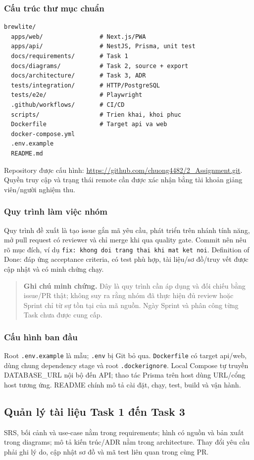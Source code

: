 \documentclass[12pt,a4paper]{article}
\newcommand{\tep}[1]{\nolinkurl{#1}}
\newcommand{\ghichu}[1]{\begin{quote}\small\textbf{Ghi chú minh chứng.} #1\end{quote}}
\begin{document}
\subsubsection{Cấu trúc thư mục chuẩn}
\begin{verbatim}
brewlite/
  apps/web/                # Next.js/PWA
  apps/api/                # NestJS, Prisma, unit test
  docs/requirements/       # Task 1
  docs/diagrams/           # Task 2, source + export
  docs/architecture/       # Task 3, ADR
  tests/integration/       # HTTP/PostgreSQL
  tests/e2e/               # Playwright
  .github/workflows/       # CI/CD
  scripts/                 # Trien khai, khoi phuc
  Dockerfile               # Target api va web
  docker-compose.yml
  .env.example
  README.md
\end{verbatim}
Repository được cấu hình: \url{https://github.com/chuong4482/2_Assignment.git}. Quyền truy cập và trạng thái remote cần được xác nhận bằng tài khoản giảng viên/người nghiệm thu.

\subsubsection{Quy trình làm việc nhóm}
Quy trình đề xuất là tạo issue gắn mã yêu cầu, phát triển trên nhánh tính năng, mở pull request có reviewer và chỉ merge khi qua quality gate. Commit nên nêu rõ mục đích, ví dụ \tep{fix: khong doi trang thai khi mat ket noi}. Definition of Done: đáp ứng acceptance criteria, có test phù hợp, tài liệu/sơ đồ/truy vết được cập nhật và có minh chứng chạy.

\ghichu{Đây là quy trình cần áp dụng và đối chiếu bằng issue/PR thật; không suy ra rằng nhóm đã thực hiện đủ review hoặc Sprint chỉ từ sự tồn tại của mã nguồn. Ngày Sprint và phân công từng Task chưa được cung cấp.}

\subsubsection{Cấu hình ban đầu}
Root \tep{.env.example} là mẫu; \tep{.env} bị Git bỏ qua. \tep{Dockerfile} có target api/web, dùng chung dependency stage và root \tep{.dockerignore}. Local Compose tự truyền DATABASE\_URL nội bộ đến API; thao tác Prisma trên host dùng URL/cổng host tương ứng. README chính mô tả cài đặt, chạy, test, build và vận hành.

\subsection{Quản lý tài liệu Task 1 đến Task 3}
SRS, bối cảnh và use-case nằm trong requirements; hình có nguồn và bản xuất trong diagrams; mô tả kiến trúc/ADR nằm trong architecture. Thay đổi yêu cầu phải ghi lý do, cập nhật sơ đồ và mã test liên quan trong cùng PR.
\end{document}
